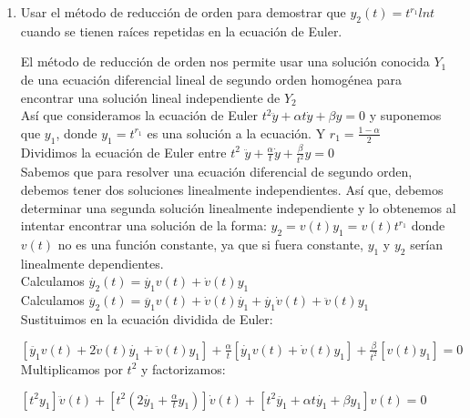 \documentclass{article}
\begin{document}
\begin{enumerate}
{        	
        }
        \item {
        	Usar el método de reducción de orden para demostrar que 
        	$y_2(t) = t ^ {r_1} ln t$ cuando se tienen raíces repetidas en la 
        	ecuación de Euler. 
        	
        	\color{azul}
        	El método de reducción de orden nos permite usar una solución conocida $Y_1$ de una ecuación diferencial lineal de segundo orden homogénea para encontrar una solución lineal independiente de $Y_2$\\
        	
        	Así que consideramos la ecuación de Euler $t^2\ddot{y} + \alpha t \dot{y} + \beta y = 0$ y suponemos que $y_1$, donde $y_1 = t^{r_1}$ es una solución a la ecuación. Y $r_1 = \frac{1 - \alpha}{2}$ \\
        	
        	Dividimos la ecuación de Euler entre $t^2$
        	$\ddot{y} + \frac{\alpha}{t}\dot{y} + \frac{\beta}{t^2}y = 0$\\
        	
        	Sabemos que para resolver una ecuación diferencial de segundo orden, debemos tener dos soluciones linealmente independientes. Así que, debemos determinar una segunda solución linealmente independiente y lo obtenemos al intentar encontrar una solución de la forma: $y_2 = v(t) y_1 = v(t) t^{r_1}$ donde $v(t)$ no es una función constante, ya que si fuera constante, $y_1$ y $y_2$ serían linealmente dependientes.\\
        	
        	Calculamos $\dot{y_2}(t) = \dot{y_1} v(t) + \dot{v}(t)y_1  $\\
        	Calculamos $\ddot{y_2}(t) = \ddot{y_1} v(t) + \dot{v}(t)\dot{y_1} + \dot{y_1}\dot{v}(t) + \ddot{v}(t)y_1  $\\
        	
        	Sustituimos en la ecuación dividida de Euler:
        	
        	$ [\ddot{y_1} v(t) + 2\dot{v}(t)\dot{y_1} + \ddot{v}(t)y_1] + \frac{\alpha}{t} [\dot{y_1} v(t) + \dot{v}(t)y_1] + \frac{\beta}{t^2} [v(t) y_1] = 0$\\
        	
        	Multiplicamos por $t^2$ y factorizamos:
        	
        	$[t^2y_1]\ddot{v}(t) + [t^2(2\dot{y_1} + \frac{\alpha}{t}y_1)]\dot{v}(t) + [t^2\ddot{y_1} + \alpha t \dot{y_1} + \beta y_1]v(t) = 0$\\
        	
}
\end{enumerate}
\end{document}

